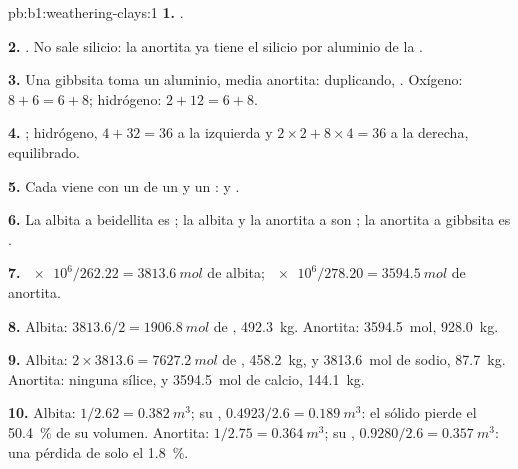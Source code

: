 \begin{solution}{pb:b1:weathering-clays:1}
\textbf{1.} .

\textbf{2.} . No sale silicio:
la anortita ya tiene el silicio por aluminio de la .

\textbf{3.} Una gibbsita toma un aluminio, media anortita: duplicando,
. Oxígeno:
$8 + 6 = 6 + 8$; hidrógeno: $2 + 12 = 6 + 8$.

\textbf{4.} ; %
hidrógeno, $4 + 32 = 36$ a la izquierda y $2\times2 + 8\times4 = 36$ a la derecha, equilibrado.

\textbf{5.} Cada  viene con un  de un  y un :
y .

\textbf{6.} La albita a beidellita es ; la albita y la anortita a  son ; la anortita a gibbsita es .

\textbf{7.} $\num{e6}/262.22 = \qty{3813.6}{mol}$ de albita;
$\num{e6}/278.20 = \qty{3594.5}{mol}$ de anortita.

\textbf{8.} Albita: $3813.6/2 = \qty{1906.8}{mol}$ de ,
\qty{492.3}{kg}. Anortita: \qty{3594.5}{mol}, \qty{928.0}{kg}.

\textbf{9.} Albita: $2\times3813.6 = \qty{7627.2}{mol}$ de ,
\qty{458.2}{kg}, y \qty{3813.6}{mol} de sodio, \qty{87.7}{kg}. Anortita:
ninguna sílice, y \qty{3594.5}{mol} de calcio, \qty{144.1}{kg}.

\textbf{10.} Albita: $1/2.62 = \qty{0.382}{m^3}$; su ,
$0.4923/2.6 = \qty{0.189}{m^3}$: el sólido pierde el \qty{50.4}{\percent} de
su volumen. Anortita: $1/2.75 = \qty{0.364}{m^3}$; su ,
$0.9280/2.6 = \qty{0.357}{m^3}$: una pérdida de solo el \qty{1.8}{\percent}.


\end{solution}
